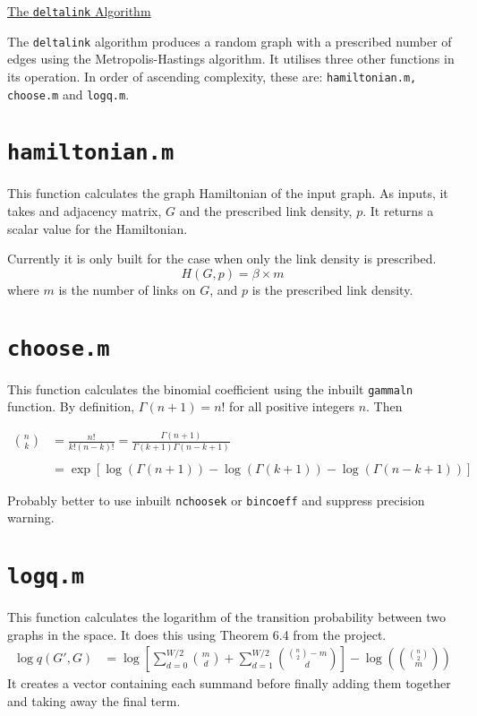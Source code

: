 \documentclass[12pt,a4paper]{article}
\author{Thomas M. Hodgson}
\theoremstyle{definition}
\newcommand{\lchoose}[2]{\binom{#1}{#2}}
\begin{document}
    \begin{center}
        \Large{\underline{The \texttt{deltalink} Algorithm}}
    \end{center}
The \texttt{deltalink} algorithm produces a random graph with a prescribed number of edges using the Metropolis-Hastings algorithm. It utilises three other functions in its operation. In order of ascending complexity, these are: \texttt{hamiltonian.m, choose.m} and \texttt{logq.m}.

\section{\texttt{hamiltonian.m}}\label{ham}
This function calculates the graph Hamiltonian of the input graph. As inputs, it takes and adjacency matrix, \(G\) and the prescribed link density, \(p\). It returns a scalar value for the Hamiltonian.

Currently it is only built for the case when only the link density is prescribed.
\[H(G,p) = \beta \times m \]
where \(m\) is the number of links on \(G\), and \(p\) is the prescribed link density.

\section{\texttt{choose.m}}\label{choose}
This function calculates the binomial coefficient using the inbuilt \texttt{gammaln} function. By definition, \(\Gamma(n+1)=n!\) for all positive integers \(n\). Then

\begin{align*} 
    \binom{n}{k} &= \frac{n!}{k!(n-k)!}= \frac{\Gamma(n+1)}{\Gamma(k+1)\Gamma(n-k+1)}\\
    &\\
    &=\exp\left[\log(\Gamma(n+1))-\log(\Gamma(k+1))-\log(\Gamma(n-k+1))\right]
\end{align*}

Probably better to use inbuilt \texttt{nchoosek} or \texttt{bincoeff} and suppress precision warning. 
\section{\texttt{logq.m}}\label{logq}
This function calculates the logarithm of the transition probability between two graphs in the space. It does this using Theorem 6.4 from the project.
\begin{align*}
\log q(G',G) &=\log\left[ \sum_{d=0}^{W/2}\binom{m}{d} + \sum_{d=1}^{W/2} \binom{\lchoose{n}{2}-m}{d}\right]-\log\left(\binom{\binom{n}{2}}{m}\right)
\end{align*} 
It creates a vector containing each summand before finally adding them together and taking away the final term.
\end{document}

